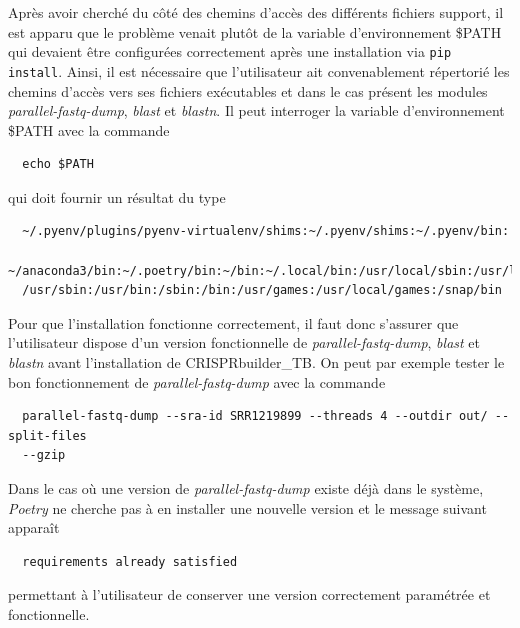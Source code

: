 \documentclass[twoside,a4paper,11pt,frenchb,openany]{report}
\begin{document}
Après avoir cherché du côté des chemins d'accès des différents fichiers support, il est apparu que le problème venait plutôt de la variable d'environnement \$PATH qui devaient être configurées correctement après une installation via \texttt{pip install}. Ainsi, il est nécessaire que l'utilisateur ait convenablement répertorié les chemins d'accès vers ses fichiers exécutables et dans le cas présent les modules \textit{parallel-fastq-dump}, \textit{blast} et \textit{blastn}. Il peut interroger la variable d'environnement \$PATH avec la commande

\begin{verbatim}
  echo $PATH
\end{verbatim}

qui doit fournir un résultat du type
\begin{verbatim}
  ~/.pyenv/plugins/pyenv-virtualenv/shims:~/.pyenv/shims:~/.pyenv/bin:
  ~/anaconda3/bin:~/.poetry/bin:~/bin:~/.local/bin:/usr/local/sbin:/usr/local/bin:
  /usr/sbin:/usr/bin:/sbin:/bin:/usr/games:/usr/local/games:/snap/bin
\end{verbatim}

Pour que l'installation fonctionne correctement, il faut donc s'assurer que l'utilisateur dispose d'un version fonctionnelle de \textit{parallel-fastq-dump}, \textit{blast} et \textit{blastn} avant l'installation de CRISPRbuilder\_TB. On peut par exemple tester le bon fonctionnement de \textit{parallel-fastq-dump} avec la commande 

\begin{verbatim}
  parallel-fastq-dump --sra-id SRR1219899 --threads 4 --outdir out/ --split-files 
  --gzip
\end{verbatim} 

Dans le cas où une version de \textit{parallel-fastq-dump} existe déjà dans le système, \textit{Poetry} ne cherche pas à en installer une nouvelle version et le message suivant apparaît

\begin{verbatim}
  requirements already satisfied
\end{verbatim}

permettant à l'utilisateur de conserver une version correctement paramétrée et fonctionnelle.
\end{document}
